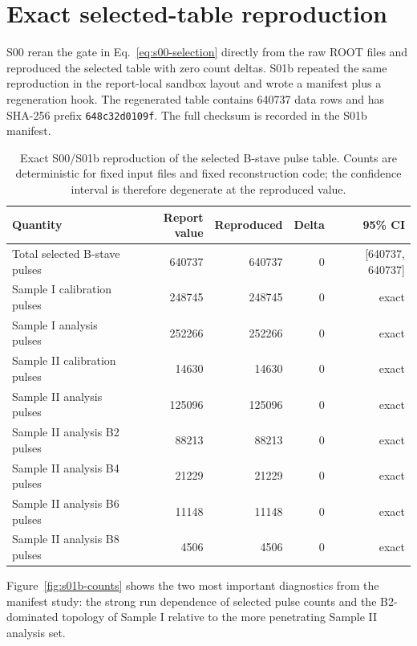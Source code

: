 \section{Exact selected-table reproduction}
\label{sec:selected-table-reproduction}

S00 reran the gate in Eq.~\ref{eq:s00-selection} directly from the raw ROOT
files and reproduced the selected table with zero count deltas.  S01b repeated
the same reproduction in the report-local sandbox layout and wrote a manifest
plus a regeneration hook.  The regenerated table contains \num{640737} data
rows and has SHA-256 prefix \texttt{648c32d0109f}.  The full checksum is
recorded in the S01b manifest.

\begin{table}[H]
  \centering
  \caption{Exact S00/S01b reproduction of the selected B-stave pulse table.
  Counts are deterministic for fixed input files and fixed reconstruction code;
  the confidence interval is therefore degenerate at the reproduced value.}
  \label{tab:s00-reproduction}
  \begin{tabular}{lrrrr}
    \toprule
    Quantity & Report value & Reproduced & Delta & 95\% CI \\
    \midrule
    Total selected B-stave pulses & \num{640737} & \num{640737} & 0 & [\num{640737}, \num{640737}] \\
    Sample I calibration pulses & \num{248745} & \num{248745} & 0 & exact \\
    Sample I analysis pulses & \num{252266} & \num{252266} & 0 & exact \\
    Sample II calibration pulses & \num{14630} & \num{14630} & 0 & exact \\
    Sample II analysis pulses & \num{125096} & \num{125096} & 0 & exact \\
    Sample II analysis B2 pulses & \num{88213} & \num{88213} & 0 & exact \\
    Sample II analysis B4 pulses & \num{21229} & \num{21229} & 0 & exact \\
    Sample II analysis B6 pulses & \num{11148} & \num{11148} & 0 & exact \\
    Sample II analysis B8 pulses & \num{4506} & \num{4506} & 0 & exact \\
    \bottomrule
  \end{tabular}
\end{table}

Figure~\ref{fig:s01b-counts} shows the two most important diagnostics from the
manifest study: the strong run dependence of selected pulse counts and the
B2-dominated topology of Sample I relative to the more penetrating Sample II
analysis set.

